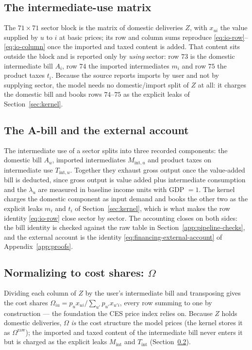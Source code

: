 \subsection{The intermediate-use matrix}\label{app:pipeline-z}

The $71\times71$ sector block is the matrix of domestic deliveries $Z$, with
$x_{ui}$ the value supplied by $u$ to $i$ at basic prices; its row and column sums
reproduce \eqref{eq:io-row}--\eqref{eq:io-column} once the imported and taxed
content is added. That content sits outside the block and is reported only by
\emph{using} sector: row $73$ is the domestic intermediate bill $A_i$, row $74$
the imported intermediates $m_i$ and row $75$ the product taxes $t_i$. Because the
source reports imports by user and not by supplying sector, the model needs no
domestic/import split of $Z$ at all: it charges the domestic bill and books rows
$74$--$75$ as the explicit leaks of Section~\ref{sec:kernel}.

\subsection{The A-bill and the external account}\label{app:abill}

The intermediate use of a sector splits into three recorded components: the
domestic bill $A_u$, imported intermediates $M_{\mathrm{int},u}$ and product
taxes on intermediate use $T_{\mathrm{int},u}$. Together they exhaust gross
output once the value-added bill is deducted, since gross output is value added
plus intermediate consumption and the $\lambda_u$ are measured in baseline
income units with GDP $=1$. The kernel charges the domestic component as input
demand and books the other two as the explicit leaks $m_i$ and $t_i$ of
Section~\ref{sec:kernel}, which is what makes the row identity \eqref{eq:io-row}
close sector by sector. The accounting closes on both sides: the bill identity
is checked against the raw table in Section~\ref{app:pipeline-checks}, and the
external account is the identity \eqref{eq:financing-external-account} of
Appendix~\ref{app:proofs}.

\subsection{Normalizing to cost shares: $\Omega$}\label{app:pipeline-omega}

Dividing each column of $Z$ by the user's intermediate bill and transposing
gives the cost shares
$\Omega_{iu}=p_ux_{ui}/\textstyle\sum_{u'}p_{u'}x_{u'i}$, every row summing to one
by construction --- the foundation the CES price index relies on. Because $Z$
holds domestic deliveries, $\Omega$ \emph{is} the cost structure the model prices
(the kernel stores it as $\Omega^{\mathrm{raw}}$); the imported and taxed content
of the intermediate bill never enters it but is charged as the explicit leaks
$M_{\mathrm{int}}$ and $T_{\mathrm{int}}$ (Section~\ref{app:abill}).

